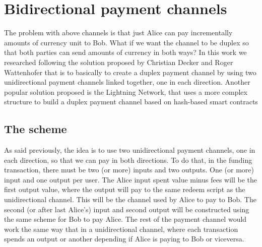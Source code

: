 \documentclass[12pt,journal,compsoc]{IEEEtran}
\begin{document}
\section{Bidirectional payment channels}
The problem with above channels is that just Alice can pay incrementally amounts of currency unit to Bob. What if we want the channel to be duplex so that both parties can send amounts of currency in both ways? In this work we researched following the solution proposed by Christian Decker and Roger Wattenhofer\cite{decker2015fast} that is to basically to create a duplex payment channel by using two unidirectional payment channels linked together, one in each direction. Another popular solution proposed is the Lightning Network, that uses a more complex structure to build a duplex payment channel based on hash-based smart contracts\cite{poon2015bitcoin}
\subsection{The scheme}
As said previously, the idea is to use two unidirectional payment channels, one in each direction, so that we can pay in both directions. To do that, in the funding transaction, there must be two (or more) inputs and two outputs. One (or more) input and one output per user. The Alice input spent value minus fees will be the first output value, where the output will pay to the same redeem script as the unidirectional channel. This will be the channel used by Alice to pay to Bob. The second (or after last Alice's) input and second output will be constructed using the same scheme for Bob to pay Alice. The rest of the payment channel would work the same way that in a unidirectional channel, where each transaction spends an output or another depending if Alice is paying to Bob or viceversa.
\end{document}
